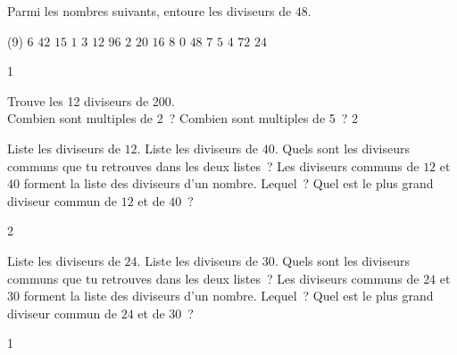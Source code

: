 \documentclass[a4paper,12pt]{report}
\begin{document}
\begin{exop}{
    Parmi les nombres suivants, entoure les diviseurs de $48$.
    \vspace{-0.3cm}
    \begin{tasks}[after-item-skip=0.2em](9)
\task[] $6$ 
\task[] $42$ 
\task[] $15$ 
\task[] $1$ 
\task[] $3$ 
\task[] $12$ 
\task[] $96$ 
\task[] $2$ 
\task[] $20$ 
\task[] $16$  
\task[] $8$  
\task[] $0$ 
\task[] $48$ 
\task[] $7$ 
\task[] $5$ 
\task[] $4$  
\task[] $72$ 
\task[] $24$ 
    \end{tasks}
}{1}\end{exop} %













\begin{exo}{
    Trouve les 12 diviseurs de 200. \\ Combien sont multiples de 2~? Combien sont multiples de 5~?
}{2}\end{exo}












\begin{exo}{
    \begin{tasks}[after-item-skip=0.2em]
    \task Liste les diviseurs de $12$.
    \task Liste les diviseurs de $40$.
    \task Quels sont les diviseurs communs que tu retrouves dans les deux listes~?
    \task Les diviseurs communs de $12$ et $40$ forment la liste des diviseurs d'un nombre. Lequel~?
    \task Quel est le plus grand diviseur commun de $12$ et de $40$~?
\end{tasks}
}{2}\end{exo}






\begin{exo}{
		\vspace{-0.3cm}
\begin{tasks}[after-item-skip=0.2em]
    \task Liste les diviseurs de $24$.
    \task Liste les diviseurs de $30$.
    \task Quels sont les diviseurs communs que tu retrouves dans les deux listes~?
    \task Les diviseurs communs de $24$ et $30$ forment la liste des diviseurs d'un nombre. Lequel~?
    \task Quel est le plus grand diviseur commun de $24$ et de $30$~?
\end{tasks}
}{1}\end{exo}
\end{document}
